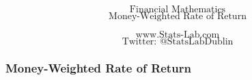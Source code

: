 \documentclass{beamer}
\begin{document}
\begin{frame}
\bigskip
{
\Huge
\[ \mbox{Financial Mathematics}  \]
\huge
\[ \mbox{Money-Weighted Rate of Return}  \]
}

{
\LARGE
\[ \mbox{www.Stats-Lab.com}  \]
\[ \mbox{Twitter: @StatsLabDublin} \]
}
\end{frame}
\begin{frame}
\frametitle{Money-Weighted Rate of Return}
\Large
\end{frame}
\end{document}
